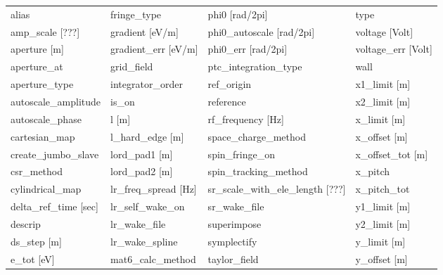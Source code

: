  \begin{tabular}{llll} \toprule
alias                          & fringe_type                    & phi0 [rad/2pi]                 & type                           \\
amp_scale [???]                & gradient [eV/m]                & phi0_autoscale [rad/2pi]       & voltage [Volt]                 \\
aperture [m]                   & gradient_err [eV/m]            & phi0_err [rad/2pi]             & voltage_err [Volt]             \\
aperture_at                    & grid_field                     & ptc_integration_type           & wall                           \\
aperture_type                  & integrator_order               & ref_origin                     & x1_limit [m]                   \\
autoscale_amplitude            & is_on                          & reference                      & x2_limit [m]                   \\
autoscale_phase                & l [m]                          & rf_frequency [Hz]              & x_limit [m]                    \\
cartesian_map                  & l_hard_edge [m]                & space_charge_method            & x_offset [m]                   \\
create_jumbo_slave             & lord_pad1 [m]                  & spin_fringe_on                 & x_offset_tot [m]               \\
csr_method                     & lord_pad2 [m]                  & spin_tracking_method           & x_pitch                        \\
cylindrical_map                & lr_freq_spread [Hz]            & sr_scale_with_ele_length [???] & x_pitch_tot                    \\
delta_ref_time [sec]           & lr_self_wake_on                & sr_wake_file                   & y1_limit [m]                   \\
descrip                        & lr_wake_file                   & superimpose                    & y2_limit [m]                   \\
ds_step [m]                    & lr_wake_spline                 & symplectify                    & y_limit [m]                    \\
e_tot [eV]                     & mat6_calc_method               & taylor_field                   & y_offset [m]                   \\

\end{tabular}
